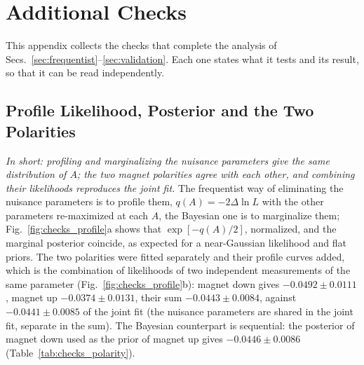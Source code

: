\section{Additional Checks}
\label{sec:appendix_checks}
This appendix collects the checks that complete the analysis of Secs.~\ref{sec:frequentist}--\ref{sec:validation}. Each one states what it tests and its result, so that it can be read independently.

\subsection{Profile Likelihood, Posterior and the Two Polarities}
\label{sec:checks_profile}
\emph{In short: profiling and marginalizing the nuisance parameters give the same distribution of $A$; the two magnet polarities agree with each other, and combining their likelihoods reproduces the joint fit.}
The frequentist way of eliminating the nuisance parameters is to profile them, $q(A)=-2\Delta\ln L$ with the other parameters re-maximized at each $A$, the Bayesian one is to marginalize them; Fig.~\ref{fig:checks_profile}a shows that $\exp[-q(A)/2]$, normalized, and the marginal posterior coincide, as expected for a near-Gaussian likelihood and flat priors. The two polarities were fitted separately and their profile curves added, which is the combination of likelihoods of two independent measurements of the same parameter (Fig.~\ref{fig:checks_profile}b): magnet down gives $-0.0492\pm0.0111$, magnet up $-0.0374\pm0.0131$, their sum $-0.0443\pm0.0084$, against $-0.0441\pm0.0085$ of the joint fit (the nuisance parameters are shared in the joint fit, separate in the sum). The Bayesian counterpart is sequential: the posterior of magnet down used as the prior of magnet up gives $-0.0446\pm0.0086$ (Table~\ref{tab:checks_polarity}).


\begin{table}[h]
\centering
{}
\caption{$\Araw$ for the two magnet polarities and their combination, by the two methods; the frequentist combination is the sum of the profile likelihoods of the two polarities, the Bayesian one the sequential update of the posterior.}
\label{tab:checks_polarity}
\end{table}

